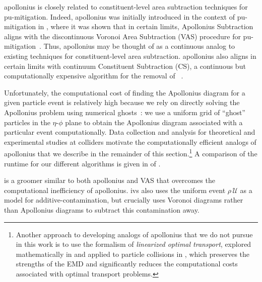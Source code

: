 \gls{apollonius} is closely related to constituent-level area subtraction techniques for \gls{pu-mitigation}.
%
Indeed, \gls{apollonius} was initially introduced in the context of \gls{pu-mitigation} in , where it was shown that in certain limits, Apollonius Subtraction aligns with the discontinuous Voronoi Area Subtraction (VAS) procedure for \gls{pu-mitigation}~\cite{Cacciari:2007fd, Cacciari:2008gn, Cacciari:2011ma}.
%
Thus, \gls{apollonius} may be thought of as a continuous analog to existing techniques for constituent-level area subtraction.
%
\gls{apollonius} also aligns in certain limits with continuum Constituent Subtraction (CS), a continuous but computationally expensive algorithm for the removal of ~\cite{Berta:2014eza, Komiske:2020qhg}.

Unfortunately, the computational cost of finding the Apollonius diagram for a given particle event is relatively high because we rely on directly solving the Apollonius problem using numerical ghosts~\cite{Komiske:2020qhg}:
%
we use a uniform grid of ``ghost'' particles in the \(\eta\)-\(\phi\) plane to obtain the Apollonius diagram associated with a particular event computationally.
%
Data collection and analysis for theoretical and experimental studies at colliders motivate the computationally efficient analogs of \gls{apollonius} that we describe in the remainder of this section.\footnote{Another approach to developing analogs of \gls{apollonius} that we do not pursue in this work is to use the formalism of \textit{linearized optimal transport}, explored mathematically in  and applied to particle collisions in , which preserves the strengths of the EMD and significantly reduces the computational costs associated with optimal transport problems.}
%
A comparison of the runtime for our different \PIRANHA{} algorithms is given in  of .



 is a \PIRANHA{} groomer similar to both \gls{apollonius} and VAS that overcomes the computational inefficiency of \gls{apollonius}.
%
\gls{ivs} also uses the uniform event \(\rho\,\mathcal U\) as a model for \gls{additive-contamination}, but crucially uses Voronoi diagrams rather than Apollonius diagrams to subtract this contamination away.


